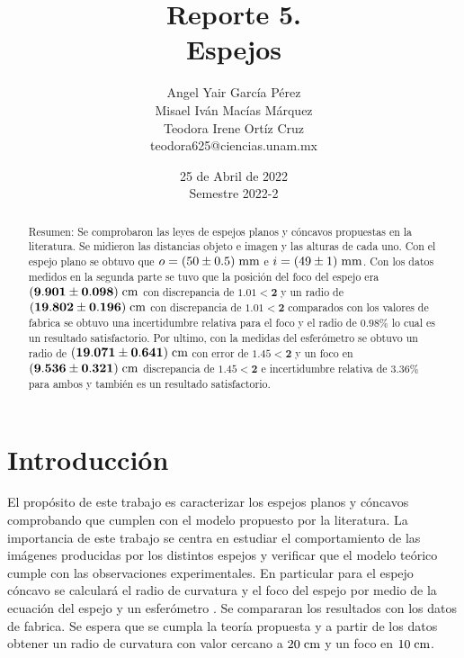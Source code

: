 \documentclass[DIV=calc, paper=a4, fontsize=11pt]{scrartcl}
\title{Reporte 5. \\ %
Espejos} %
\author{Angel Yair García Pérez \\
Misael Iván Macías Márquez\\
Teodora Irene Ortíz Cruz\\
\small{teodora625@ciencias.unam.mx}\\}
\date{25 de Abril de 2022\\Semestre 2022-2}
\begin{document}
\maketitle
{}
\begin{abstract}

  \textcolor{carmine}{Resumen:} Se comprobaron las leyes de espejos planos y cóncavos propuestas en la literatura. Se midieron las distancias objeto e imagen y las alturas de cada uno. Con el espejo plano se obtuvo que $o=(50\pm0.5)\hspace{0.1cm}\text{mm}$ e $i=(49\pm1)\hspace{0.1cm}\text{mm}$. Con los datos medidos en la segunda parte se tuvo que la  posición del foco del espejo era $\mathbf{(9.901 \pm 0.098)\hspace{0.1cm} \text{cm}}$ con discrepancia de $\mathbf{1.01 < 2}$ y un radio de $\mathbf{(19.802 \pm 0.196)\hspace{0.1cm} \text{cm}}$ con discrepancia de $\mathbf{1.01<2}$  comparados con los valores de fabrica se obtuvo una incertidumbre relativa para el foco y el radio de $0.98\%$ lo cual es un resultado satisfactorio. Por ultimo, con la medidas del esferómetro se obtuvo un radio de $\mathbf{(19.071 \pm 0.641)\hspace{0.1cm} \text{cm}}$ con error de $\mathbf{1.45<2}$ y un foco en  $\mathbf{(9.536 \pm 0.321)\hspace{0.1cm} \text{cm}}$ discrepancia de $\mathbf{1.45<2}$ e incertidumbre relativa de $3.36\%$ para ambos y también es un resultado satisfactorio.
\end{abstract}
\section*{\textcolor{carmine}{Introducción}}
 El propósito de este trabajo es caracterizar los espejos planos y cóncavos comprobando que cumplen con el modelo propuesto por la literatura\cite{Manual}. La importancia de este trabajo se centra en estudiar el comportamiento de las imágenes producidas por los distintos  espejos y verificar que el modelo teórico cumple con las observaciones experimentales. En particular para el espejo cóncavo se calculará el radio de curvatura y el foco del espejo por medio de la ecuación del espejo y un esferómetro \cite{article}. Se compararan los resultados con los datos de fabrica. Se espera que se cumpla la teoría propuesta y a partir de los datos obtener un radio de curvatura con valor cercano a $20\hspace{0.1cm}\text{cm}$ y un foco en $10\hspace{0.1cm}\text{cm}$. 
\end{document}
